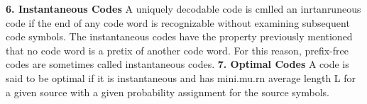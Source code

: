 
\textbf{6. Instantaneous Codes}
A uniquely decodable code is cmlled an inrtanruneous code if the end of any code word is
recognizable without examining subsequent code symbols. The instantaneous codes have the property
previously mentioned that no code word is a pretix of another code word. For this reason, prefix-free
codes are sometimes called instantaneous codes.
\textbf{7. Optimal Codes}
A code is said to be optimal if it is instantaneous and has mini.mu.rn average length L for a given
source with a given probability assignment for the source symbols.

